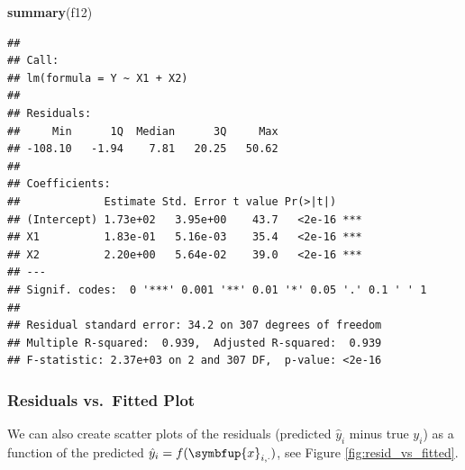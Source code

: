 \documentclass[10pt,b5paper,krantz1]{krantz}
\newenvironment{Shaded}{\begin{snugshade}}{\end{snugshade}}
\newcommand{\CommentTok}[1]{\textcolor[rgb]{0.37,0.37,0.37}{\textit{#1}}}
\newcommand{\DataTypeTok}[1]{\textcolor[rgb]{0.27,0.27,0.27}{#1}}
\newcommand{\DecValTok}[1]{\textcolor[rgb]{0.06,0.06,0.06}{#1}}
\newcommand{\KeywordTok}[1]{\textcolor[rgb]{0.27,0.27,0.27}{\textbf{#1}}}
\newcommand{\NormalTok}[1]{#1}
\newcommand{\OperatorTok}[1]{\textcolor[rgb]{0.43,0.43,0.43}{\textbf{#1}}}
\newcommand{\StringTok}[1]{\textcolor[rgb]{0.5,0.5,0.5}{#1}}
\renewcommand{\mathbf}[1]{\symbfup{#1}}
\begin{document}
\begin{Shaded}
\begin{Highlighting}[]
\KeywordTok{summary}\NormalTok{(f12)}
\end{Highlighting}
\end{Shaded}

\begin{verbatim}
## 
## Call:
## lm(formula = Y ~ X1 + X2)
## 
## Residuals:
##     Min      1Q  Median      3Q     Max 
## -108.10   -1.94    7.81   20.25   50.62 
## 
## Coefficients:
##             Estimate Std. Error t value Pr(>|t|)    
## (Intercept) 1.73e+02   3.95e+00    43.7   <2e-16 ***
## X1          1.83e-01   5.16e-03    35.4   <2e-16 ***
## X2          2.20e+00   5.64e-02    39.0   <2e-16 ***
## ---
## Signif. codes:  0 '***' 0.001 '**' 0.01 '*' 0.05 '.' 0.1 ' ' 1
## 
## Residual standard error: 34.2 on 307 degrees of freedom
## Multiple R-squared:  0.939,  Adjusted R-squared:  0.939 
## F-statistic: 2.37e+03 on 2 and 307 DF,  p-value: <2e-16
\end{verbatim}

\hypertarget{residuals-vs.-fitted-plot}{%
\subsubsection{Residuals vs.~Fitted Plot}\label{residuals-vs.-fitted-plot}}

We can also create scatter plots of the residuals
(predicted \(\hat{y}_i\) minus
true \(y_i\)) as a function of the predicted
\(\hat{y}_i=f(\mathbf{x}_{i,\cdot})\), see Figure \ref{fig:resid_vs_fitted}.

\begin{Shaded}
\end{Shaded}
\end{document}
